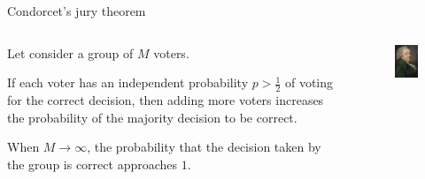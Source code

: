 \documentclass{beamer}
\begin{document}
\begin{frame}{Condorcet's jury theorem}

\begin{columns}
\begin{column}{0.65\textwidth}
Let consider a group of $M$ voters.

\vspace{1cm}

If each voter has an independent  probability $p > \tfrac{1}{2}$ of voting for
the correct decision, then adding more voters increases the probability of the
majority decision to be correct.

\vspace{1cm}

When $M \to \infty$, the probability that the
decision taken by the group is correct approaches $1$.

\end{column}

\begin{column}{0.35\textwidth}
\begin{figure}
    \includegraphics[scale=1.0]{./figures/condorcet.png}
\end{figure}
\end{column}
\end{columns}

\end{frame}
\end{document}
